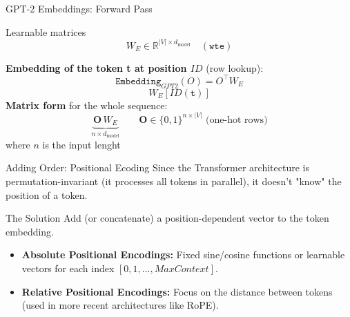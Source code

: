 \documentclass[aspectratio=169]{beamer}
\begin{document}
	


\begin{frame}{GPT-2 Embeddings: Forward Pass}
	\small
	
	\begin{block}{Learnable matrices}
		\[
		W_E \in \mathbb{R}^{|V| \times d_{\text{model}}} \quad (\texttt{wte})
		\] 
	\end{block}
	
	\textbf{Embedding of the token t at position $ID$} (row lookup):
	\begin{equation}
		\texttt{Embedding}_{GPT2}(O) = O^{\top} W_E 
	\end{equation}
	 $$W_E[ID(\texttt{t})]$$
	\textbf{Matrix form} for the whole sequence:
	\begin{equation}
		\underbrace{\mathbf{O}\,W_E}_{n \times d_{\text{model}}} 
		\qquad \mathbf{O} \in \{0,1\}^{n \times |V|} \text{ (one-hot rows)}
	\end{equation}
	where $n$ is the input lenght
\end{frame}


	
	
	\begin{frame}{Adding Order: Positional Ecoding}
		Since the Transformer architecture is permutation-invariant (it processes all tokens in parallel), it doesn't "know" the position of a token.
		\begin{block}{The Solution}
			Add (or concatenate) a position-dependent vector to the token embedding.
		\end{block}
	\begin{itemize}
			\item \textbf{Absolute Positional Encodings:} Fixed sine/cosine functions or learnable vectors for each index $[0, 1, ..., MaxContext]$.
			\item \textbf{Relative Positional Encodings:} Focus on the distance between tokens (used in more recent architectures like RoPE).
	\end{itemize}
\end{frame}
\end{document}
